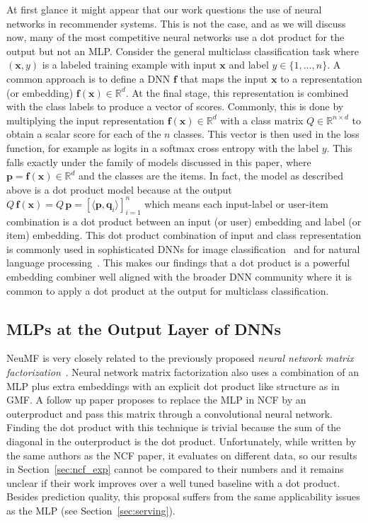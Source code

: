 \documentclass{article}
\newcommand{\bx}{\mathbf{x}}
\newcommand{\Embi}{Q}
\newcommand{\embu}{\mathbf{p}}
\newcommand{\embi}{\mathbf{q}}
\begin{document}
\label{sec:dnn}
At first glance it might appear that our work questions the use of neural networks in recommender systems.
This is not the case, and as we will discuss now, many of the most competitive neural networks use a dot product for the output but not an MLP.
Consider the general multiclass classification task where $(\bx,y)$ is a labeled training example with input $\bx$ and label $y \in \{1,\ldots,n\}$.
A common approach is to define a DNN $\textbf{f}$ that maps the input $\bx$ to a representation (or embedding) $\textbf{f}(\bx) \in \mathbb{R}^d$.
At the final stage, this representation is combined with the class labels to produce a vector of scores.
Commonly, this is done by multiplying the input representation $\textbf{f}(\bx) \in \mathbb R^d$ with a class matrix $\Embi \in \mathbb{R}^{n \times d}$ to obtain a scalar score for each of the $n$ classes.
This vector is then used in the loss function, for example as logits in a softmax cross entropy with the label $y$.
This falls exactly under the family of models discussed in this paper, where $\embu = \textbf{f}(\bx) \in \mathbb{R}^d$ and the classes are the items.
In fact, the model as described above is a dot product model because at the output $\Embi\,\textbf{f}(\bx) = \Embi\,\embu = [\langle \embu, \embi_i \rangle]_{i=1}^n$ which means each input-label or user-item combination is a dot product between an input (or user) embedding and label (or item) embedding.
This dot product combination of input and class representation is commonly used in sophisticated DNNs for image classification~\cite{alexnet-2012,he:cvpr16} and for natural language processing~\cite{bengio2003neural,mikolov2013distributed,devlin:arxiv18}.
This makes our findings that a dot product is a powerful embedding combiner well aligned with the broader DNN community where it is common to apply a dot product at the output for multiclass classification.

\subsection{MLPs at the Output Layer of DNNs}

NeuMF is very closely related to the previously proposed \emph{neural network matrix factorization}~\cite{dziugaite:arxiv15}.
Neural network matrix factorization also uses a combination of an MLP plus extra embeddings with an explicit dot product like structure as in GMF.
A follow up paper \cite{he:ijcai18} proposes to replace the MLP in NCF by an outerproduct and pass this matrix through a convolutional neural network.
Finding the dot product with this technique is trivial because the sum of the diagonal in the outerproduct is the dot product.
Unfortunately, while written by the same authors as the NCF paper, it evaluates on different data, so our results in Section~\ref{sec:ncf_exp} cannot be compared to their numbers and it remains unclear if their work improves over a well tuned baseline with a dot product.
Besides prediction quality, this proposal suffers from the same applicability issues as the MLP (see Section~\ref{sec:serving}).
\end{document}
